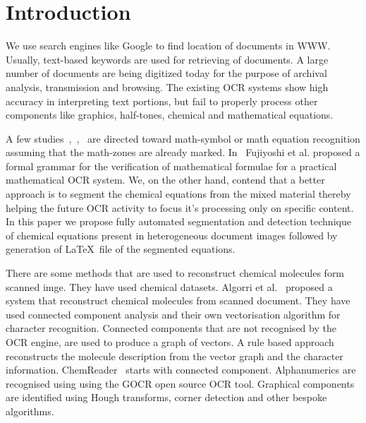 \documentclass[conference]{IEEEtran}
\begin{document}




%
\IEEEpeerreviewmaketitle



\section{Introduction}
We use search engines like Google to find location of documents in WWW. Usually, text-based keywords are used for retrieving of documents. 
A large number of documents are being digitized today for the purpose of archival analysis, transmission and browsing. The existing OCR systems show high accuracy in interpreting text portions, but fail to properly process other components
like graphics, half-tones, chemical and mathematical equations.

A few studies~\cite{blostein_97},~\cite{chan_00},~\cite{Garain_07} are directed toward math-symbol or math equation recognition assuming that the math-zones
are already marked. In~\cite{uchid_10} Fujiyoshi et al. proposed  a formal grammar for the verification of mathematical formulae for a practical mathematical OCR system.
We, on the other hand, contend that a better approach is to segment the chemical equations from the mixed material thereby helping the future OCR activity to focus it’s processing only on specific content. In this paper we propose  fully automated segmentation and detection technique of chemical equations
present in heterogeneous document images followed by generation of \LaTeX\ file of the segmented equations.

There are some methods that are used to reconstruct chemical molecules form scanned imge. They have used chemical datasets. Algorri et al.~\cite{algorri_07, algorri_07a} proposed a system that reconstruct chemical molecules from scanned document. They have used connected component analysis and their own vectorisation algorithm for character recognition. Connected components that are not recognised by the OCR engine, are used to produce a graph of vectors. A rule based approach reconstructs the molecule description from the vector graph and the character information. 
ChemReader~\cite{park_09} starts with connected component. Alphanumerics are  recognised using using the GOCR open source OCR tool. Graphical components are  identified using Hough transforms, corner detection and other bespoke algorithms.
\end{document}
